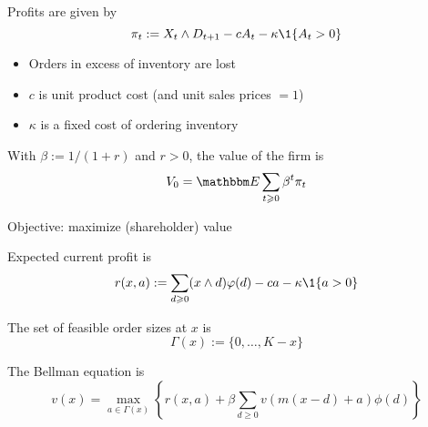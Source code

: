 \begin{frame}
    
    Profits are given by
    \begin{equation*}
        \pi_t := X_t \wedge D_{t+1} - c A_t - \kappa \1\{A_t > 0\}
    \end{equation*}

    \begin{itemize}
        \item Orders in excess of
            inventory are lost 
    \vspace{0.5em}
        \item $c$ is unit product cost (and unit sales prices $=1$)
    \vspace{0.5em}
        \item $\kappa$ is a fixed cost of ordering inventory
    \end{itemize}

    \vspace{0.5em}
    \vspace{0.5em}

    With $\beta := 1/(1+r)$ and $r > 0$, the value of the firm is 
    \begin{equation*}
        V_0 = \EE \sum_{t \geq 0} \beta^t \pi_t
    \end{equation*}

    \vspace{0.5em}
    \vspace{0.5em}
    Objective: maximize (shareholder) value

\end{frame}


\begin{frame}
    
    Expected current profit is
    \begin{equation*}
        r(x, a)  := \sum_{d \geq 0} (x \wedge d) \phi(d) 
            - c a - \kappa \1\{a > 0\}
    \end{equation*}

    \vspace{0.5em}
    \vspace{0.5em}
    The set of feasible order sizes
    at $x$ is 
    \begin{equation*}
        \Gamma(x) := \{0, \ldots, K - x\}
    \end{equation*}
    \vspace{0.5em}

    The Bellman equation is
    \begin{equation*}
        v(x)
        = \max_{a \in \Gamma(x)} 
        \left\{
            r(x, a)
            + \beta
            \sum_{d \geq 0} v(m(x - d) + a) \phi(d)
        \right\}
    \end{equation*}

\end{frame}

